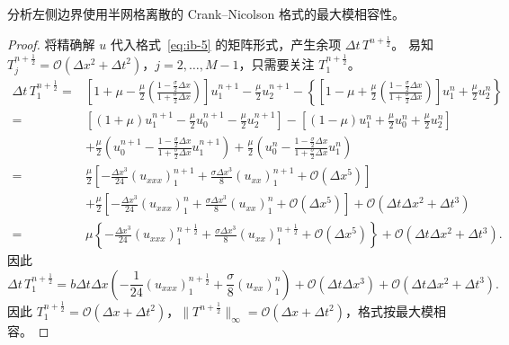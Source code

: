 \begin{example}
    分析左侧边界使用半网格离散的 Crank–Nicolson 格式的最大模相容性。
\end{example}

\begin{proof}
    将精确解 $u$ 代入格式~\eqref{eq:ib-5} 的矩阵形式，产生余项 $\Delta t \,T^{n+\frac12}$。
    易知 $T_j^{n+\frac12} = \mathcal{O}(\Delta x^2 + \Delta t^2)$，$j=2,\dots,M-1$，只需要关注 $T_1^{n+\frac12}$。
    \begin{align*}
        \Delta t\, T_1^{n+\frac12} ={} &
        \left[ 1 + \mu - \frac{\mu}{2}\left(\frac{1-\frac{\sigma}2 \Delta x}{1 +\frac{\sigma}2 \Delta x}\right) \right] u_1^{n+1} - \frac{\mu}2 u_2^{n+1}
        - \left\{\left[ 1 - \mu + \frac{\mu}{2}\left(\frac{1-\frac{\sigma}2 \Delta x}{1 +\frac{\sigma}2 \Delta x}\right) \right] u_1^{n} + \frac{\mu}2 u_2^{n}\right\}              \\
        ={}                            & \left[
        (1+\mu) u_1^{n+1} - \frac{\mu}2 u_0^{n+1} - \frac{\mu}2 u_2^{n+1}
        \right]
        -
        \left[
        (1-\mu) u_1^{n} + \frac{\mu}2 u_0^{n} + \frac{\mu}2 u_2^{n}
        \right]                                                                                                                                                                     \\
                                       & + \frac{\mu}2 \left( u_0^{n+1} - \frac{1-\frac{\sigma}2 \Delta x}{1 +\frac{\sigma}2 \Delta x}u_1^{n+1} \right)
        + \frac{\mu}2 \left( u_0^{n} - \frac{1-\frac{\sigma}2 \Delta x}{1 +\frac{\sigma}2 \Delta x}u_1^{n} \right)                                                                  \\
        ={}                            & \frac{\mu}2 \left[ -\frac{\Delta x^3}{24} (u_{xxx})_1^{n+1} + \frac{\sigma \Delta x^3}8 (u_{xx})_1^{n+1} + \mathcal{O}(\Delta x^5) \right]
        \\ &+ \frac{\mu}2 \left[ -\frac{\Delta x^3}{24} (u_{xxx})_1^n + \frac{\sigma \Delta x^3}8 (u_{xx})_1^n + \mathcal{O}(\Delta x^5) \right]
        + \mathcal{O}(\Delta t \Delta x^2 + \Delta t^3)                                                                                                                             \\
        ={}                            & \mu \left\{
        -\frac{\Delta x^3}{24} (u_{xxx})_1^{n+\frac12} + \frac{\sigma \Delta x^3}8 (u_{xx})_1^{n+\frac12} + \mathcal{O}(\Delta x^5)
        \right\} + \mathcal{O}(\Delta t \Delta x^2 + \Delta t^3).
    \end{align*}
    因此
    \[
        \Delta t\, T_1^{n+\frac12} ={} b \Delta t \Delta x \left( -\frac1{24} (u_{xxx})_1^{n+\frac12} + \frac{\sigma}8 (u_{xx})_1^n \right)
        + \mathcal{O}(\Delta t\Delta x^3) + \mathcal{O}( \Delta t \Delta x^2 + \Delta t^3).
    \]
    因此 $T_1^{n+\frac12} = \mathcal{O}(\Delta x + \Delta t^2)$，$\|T^{n+\frac12}\|_{\infty} = \mathcal{O}(\Delta x + \Delta t^2)$，格式按最大模相容。
\end{proof}


